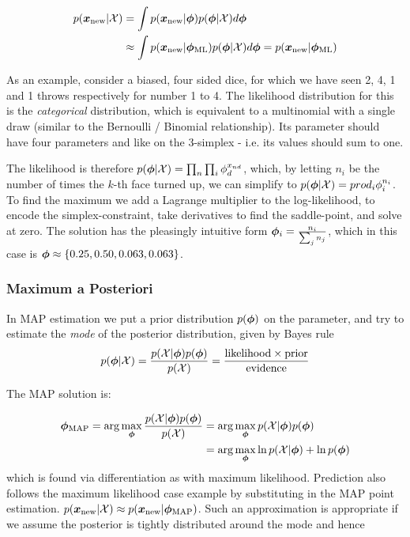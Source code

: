 \begin{align*}
p({ \bm x_{\text{new}} } | { \mathcal{X} }) 
&= \int p({ \bm x_{\text{new}} } | { \bm \phi }) p({ \bm \phi } | { \mathcal{X} }) d{ \bm \phi } \\
&\approx \int p({ \bm x_{\text{new}} } | { {{ \bm \phi }}_{\text{ML}} }) p({ \bm \phi } | { \mathcal{X} }) d{ \bm \phi }
=  p({ \bm x_{\text{new}} } | { {{ \bm \phi }}_{\text{ML}} })
\end{align*}

As an example, consider a biased, four sided dice, for which we have seen 2, 4, 1 and 1 throws respectively for number 1 to 4. The likelihood distribution for this is the \emph{categorical} distribution, which is equivalent to a multinomial with a single draw (similar to the Bernoulli / Binomial relationship). Its parameter should have four parameters and like on the 3-simplex - i.e. its values should sum to one. 

The likelihood is therefore $p({ \bm \phi } | { \mathcal{X} }) = \prod_n \prod_i \phi_d^{x_{nd}}$, which, by letting $n_i$ be the number of times the $k$-th face turned up, we can simplify to $p({ \bm \phi } | { \mathcal{X} }) = prod_i \phi_i^{n_i}$. To find the maximum we add a Lagrange multiplier to the log-likelihood, to encode the simplex-constraint, take derivatives to find the saddle-point, and solve at zero. The solution has the pleasingly intuitive form ${ \bm \phi }_i = \frac{n_i}{\sum_j n_j}$, which in this case is ${ \bm \phi } \approx \{0.25, 0.50, 0.063, 0.063\}$. 

\subsubsection*{Maximum a Posteriori}
In MAP estimation we put a prior distribution $p({ \bm \phi })$ on the parameter, and try to estimate the \emph{mode} of the posterior distribution, given by Bayes rule
\begin{align*}
p({ \bm \phi } | { \mathcal{X} }) = \frac{p({ \mathcal{X} } | { \bm \phi })p({ \bm \phi })}{p({ \mathcal{X} })} = \frac{\text{likelihood} \times \text{prior}}{\text{evidence}}
\end{align*}

The MAP solution is:

\begin{align*}
{ { {  \bm \phi  } }_{\text{MAP}} } = \arg \max_{{ \bm \phi }} \frac{p({ \mathcal{X} } | { \bm \phi })p({ \bm \phi })}{p({ \mathcal{X} })}
& = \arg \max_{{ \bm \phi }} p({ \mathcal{X} } | { \bm \phi })p({ \bm \phi }) \\
 & = \arg \max_{ \bm \phi } \ln p({ \mathcal{X} } | { \bm \phi }) + \ln p({ \bm \phi })
\end{align*}
which is found via differentiation as with maximum likelihood. Prediction also follows the maximum likelihood case example by substituting in the MAP point estimation. $p({ \bm x_{\text{new}} } | { \mathcal{X} }) \approx p({ \bm x_{\text{new}} } | { {{ \bm \phi }}_{\text{MAP}} })$. Such an approximation is appropriate if we assume the posterior is tightly distributed around the mode and hence

